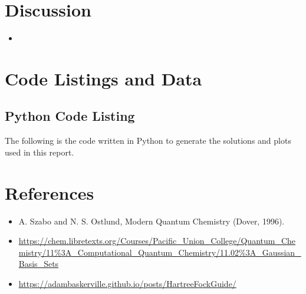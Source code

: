 \documentclass[10pt, oneside, letterpaper]{article}
\begin{document}
\newpage
\section{Discussion}

\begin{itemize}
    \item 
\end{itemize}

\newpage
\section{Code Listings and Data}

\subsection{Python Code Listing}
\label{code-listing-python}
The following is the code written in Python to generate the solutions and plots used in this report.
% 

\newpage
\section{References}

\begin{itemize}
  \item A. Szabo and N. S. Ostlund, Modern Quantum Chemistry (Dover, 1996).
  \item \url{https://chem.libretexts.org/Courses/Pacific_Union_College/Quantum_Chemistry/11%3A_Computational_Quantum_Chemistry/11.02%3A_Gaussian_Basis_Sets} %
  \item \url{https://adambaskerville.github.io/posts/HartreeFockGuide/}
\end{itemize}
\end{document}
